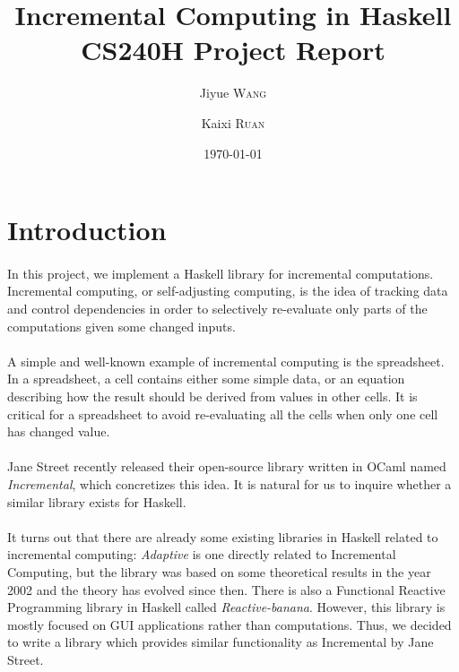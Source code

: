 \documentclass[a4paper, twocolumn]{article}
\title{Incremental Computing in Haskell\\CS240H Project Report}
\author[]{Jiyue \textsc{Wang}}
\author[]{Kaixi \textsc{Ruan}}
\affil[]{}
\date{\today}
\begin{document}
\maketitle 

\section{Introduction}

\paragraph{} In this project, we implement a Haskell library for incremental computations. Incremental computing, or self-adjusting computing, is the idea of tracking data and control dependencies in order to selectively re-evaluate only parts of the computations given some changed inputs.
\paragraph{} A simple and well-known example of incremental computing is the spreadsheet. 
In a spreadsheet, a cell contains either some simple data, or an equation describing how the result should be derived from values in other cells. It is critical for a spreadsheet to avoid re-evaluating all the cells when only one cell has changed value. 
\paragraph{} Jane Street recently released their open-source library written in OCaml named \textit{Incremental}\cite{Jane}, which concretizes this idea. It is natural for us to inquire whether a similar library exists for Haskell. 
\paragraph{} It turns out that there are already some existing libraries in Haskell related to incremental computing: \textit{Adaptive}\cite{Adaptive} is one directly related to Incremental Computing, but the library was based on some theoretical results in the year 2002\cite{acar2006adaptive} and the theory has evolved since then. There is also a Functional Reactive Programming library in Haskell called \textit{Reactive-banana}\cite{reactive}. However, this library is mostly focused on GUI applications rather than computations. Thus, we decided to write a library which provides similar functionality as Incremental by Jane Street.
\end{document}
